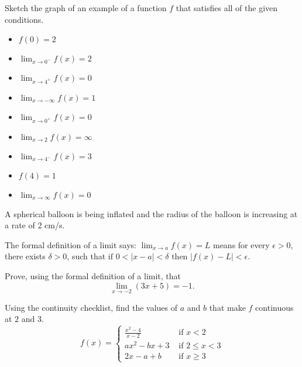 \documentclass[12pt, addpoints]{exam/exam}
\newcommand{\1}{^{-1}}
\theoremstyle{plain}
\begin{document}
\begin{questions}
\newpage
\question[18] %
Sketch the graph of an example of a function $f$ that satisfies all of the given conditions.
	\begin{itemize}
	\item $f(0)=2$
	\item $\lim_{x\to 0^-}f(x)=2$
	\item $\lim_{x\to 4^+}f(x)=0$
	\item $\lim_{x\to -\infty}f(x)=1$
	\item $\lim_{x\to 0^+}f(x)=0$
	\item $\lim_{x\to 2}f(x)=\infty$
	\item $\lim_{x\to 4^-}f(x)=3$
	\item $f(4)=1$
	\item $\lim_{x\to \infty}f(x)=0$
	\end{itemize}

\vfill	
\question%
A spherical balloon is being inflated and the radius of the balloon is increasing at a rate of 2 cm/s.
\vfill	

\newpage
\question[15] %
The formal definition of a limit says: $\lim_{x\to a}f(x)=L$ means for every $\epsilon>0$, there exists $\delta>0$, such that $\text{if }0<|x-a|<\delta \text{ then }|f(x)-L|<\epsilon$.

\vspace{1.5pc}
Prove, using the formal definition of a limit, that
\[
\lim_{x\to -2}(3x+5)=-1.
\]	

\newpage
\question[20] %
Using the continuity checklist, find the values of $a$ and $b$ that make $f$ continuous at $2$ and $3$.
\[
f(x)=\begin{cases}
	\frac{x^2-4}{x-2} & \text{ if }x<2 \\
	ax^2-bx+3 & \text{ if }2\leq x<3 \\
	2x-a+b & \text{ if }x\geq 3
	\end{cases}
\]


\end{questions}
\end{document}
